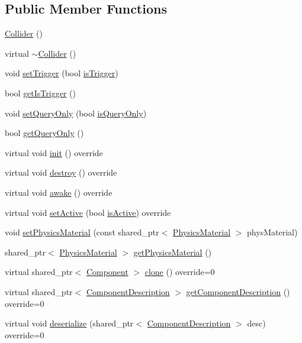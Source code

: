 \subsection*{Public Member Functions}
\begin{DoxyCompactItemize}
\item 
\hyperlink{class_collider_aa7186870221f868bbc74c3ae8609fa66}{Collider} ()
\item 
virtual \hyperlink{class_collider_abf1ce43b287c870fd72918b023217a33}{$\sim$\+Collider} ()
\item 
void \hyperlink{class_collider_af96b9fde921e93d3072e49e0bfc1d942}{set\+Trigger} (bool \hyperlink{class_collider_a3068bd0bbdb66fc93a3ef3063ac556fa}{is\+Trigger})
\item 
bool \hyperlink{class_collider_ab5f78af93e01ca53d7a74820ff6c1537}{get\+Is\+Trigger} ()
\item 
void \hyperlink{class_collider_af023309d25aa50c66771bd0d804b1dea}{set\+Query\+Only} (bool \hyperlink{class_collider_a7a04883dc178bfc1b0bbf7750eb9f4d1}{is\+Query\+Only})
\item 
bool \hyperlink{class_collider_ac4bfad43c99e8e8897e55d28f7f84c3a}{get\+Query\+Only} ()
\item 
virtual void \hyperlink{class_collider_aed04ad82be15bcba1d3dc6a09f76dae6}{init} () override
\item 
virtual void \hyperlink{class_collider_a018ec33674acec77cbd18e4df9d8ad5b}{destroy} () override
\item 
virtual void \hyperlink{class_collider_ae29d151525174adbb950c15eafbf518e}{awake} () override
\item 
virtual void \hyperlink{class_collider_ade3d0403ff4c5429310adfbe41d889ee}{set\+Active} (bool \hyperlink{class_component_a6dad4f819c0814eee8219e9b391cf583}{is\+Active}) override
\item 
void \hyperlink{class_collider_a7ac3dc7291adfb3ea35c104fdebdf67a}{set\+Physics\+Material} (const shared\+\_\+ptr$<$ \hyperlink{class_physics_material}{Physics\+Material} $>$ phys\+Material)
\item 
shared\+\_\+ptr$<$ \hyperlink{class_physics_material}{Physics\+Material} $>$ \hyperlink{class_collider_adb62c0a8938b922c2b093511dcc12751}{get\+Physics\+Material} ()
\item 
virtual shared\+\_\+ptr$<$ \hyperlink{class_component}{Component} $>$ \hyperlink{class_collider_a28d0829db9804b27590afc9979e61a1c}{clone} () override=0
\item 
virtual shared\+\_\+ptr$<$ \hyperlink{class_component_description}{Component\+Description} $>$ \hyperlink{group__serialization__functions_ga9bee953be54c842bd37244d1f3126745}{get\+Component\+Description} () override=0
\item 
virtual void \hyperlink{group__serialization__functions_gaa82ff0f6d5986bf4128bc50ec9932a04}{deserialize} (shared\+\_\+ptr$<$ \hyperlink{class_component_description}{Component\+Description} $>$ desc) override=0
\end{DoxyCompactItemize}
